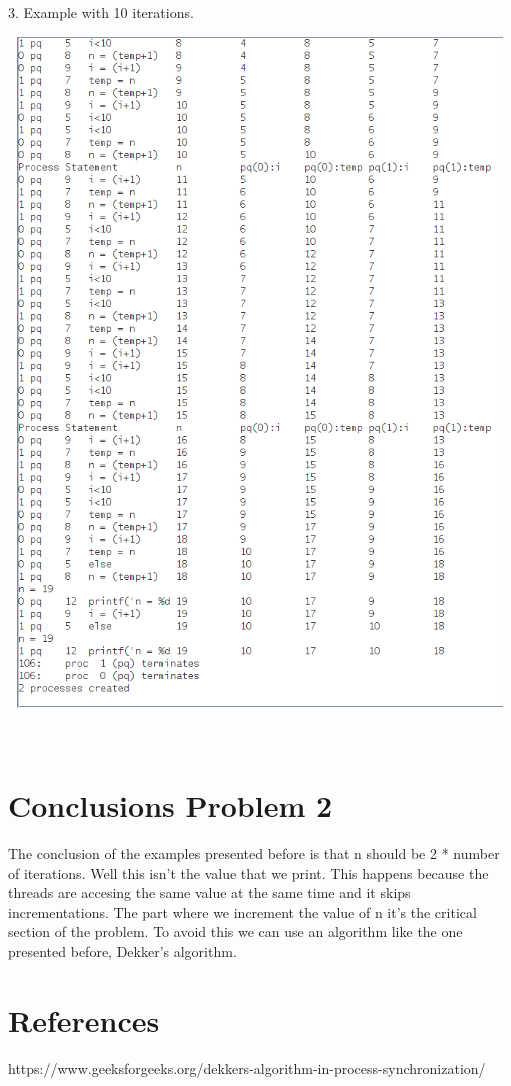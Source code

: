 \documentclass[14pt]{article}
\begin{document}
\begin{center}
3. Example with 10 iterations.
\vspace{10mm}

\includegraphics[height=7in, width = 6in]{concurrent3.png}\\
\end{center}\\
\newpage


\section*{Conclusions Problem 2}
\vspace{10 mm}
The conclusion of the examples presented before is that n should be 2 * number of iterations. Well this isn't the value that we print. This happens because the threads are accesing the same value at the same time and it skips incrementations. The part where we increment the value of n it's the critical section of the problem. To avoid this we can use an algorithm like the one presented before, Dekker's algorithm.

\newpage
\section*{References}
https://www.geeksforgeeks.org/dekkers-algorithm-in-process-synchronization/
\end{document}
